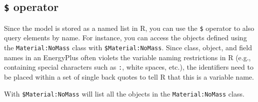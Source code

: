 \documentclass[
]{book}
\newenvironment{Shaded}{\begin{snugshade}}{\end{snugshade}}
\newcommand{\DocumentationTok}[1]{\textcolor[rgb]{0.56,0.35,0.01}{\textbf{\textit{#1}}}}
\newcommand{\FunctionTok}[1]{\textcolor[rgb]{0.00,0.00,0.00}{#1}}
\newcommand{\NormalTok}[1]{#1}
\newcommand{\SpecialCharTok}[1]{\textcolor[rgb]{0.00,0.00,0.00}{#1}}
\newcommand{\StringTok}[1]{\textcolor[rgb]{0.31,0.60,0.02}{#1}}
\begin{document}
\begin{Shaded}
\end{Shaded}

\hypertarget{operator}{%
\subsection{\texorpdfstring{\texttt{\$} operator}{\$ operator}}\label{operator}}

Since the model is stored as a named list in R, you can use the \texttt{\$} operator to also query elements by name. For instance, you can access the objects defined using the \texttt{Material:NoMass} class with \texttt{\$Material:NoMass}. Since class, object, and field names in an EnergyPlus often violets the variable naming restrictions in R (e.g., containing special characters such as \texttt{:}, white spaces, etc.), the identifiers need to be placed within a set of single back quotes \texttt{\textasciigrave{}} to tell R that this is a variable name.

With \texttt{\$\textasciigrave{}Material:NoMass\textasciigrave{}} will list all the objects in the \texttt{Material:NoMass} class.
\end{document}
